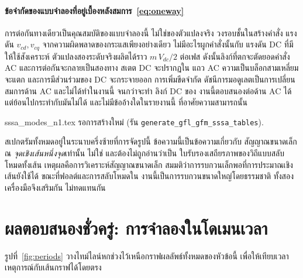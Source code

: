 \documentclass[12pt,a4paper]{article}
\begin{document}
\paragraph{ข้อจำกัดของแบบจำลองที่อยู่เบื้องหลังสมการ~\eqref{eq:oneway}}
การต่อกันทางเดียวเป็นคุณสมบัติของแบบจำลองนี้ ไม่ใช่ของตัวแปลงจริง วงรอบชั้นในสร้างคำสั่ง
แรงดัน $v_{cd},v_{cq}$ จากความผิดพลาดของกระแสเพียงอย่างเดียว ไม่มีอะไรผูกคำสั่งนั้นกับ
แรงดัน DC ที่มีให้ใช้สังเคราะห์ ตัวแปลงสองระดับจริงผลิตได้ราว $m\,V_{dc}/2$ ต่อเฟส
ดังนั้นลิงก์ที่ตกจะตัดยอดคำสั่ง AC และการต่อกันจะกลายเป็นสองทาง สเตต DC จะปรากฏใน
แถว AC ความเป็นบล็อกสามเหลี่ยมจะแตก และการมีส่วนร่วมของ DC จะกระจายออก การเพิ่มขีดจำกัด
ดัชนีการมอดูเลตเป็นการเปลี่ยนสมการด้าน AC และไม่ได้ทำในงานนี้ จนกว่าจะทำ ลิงก์ DC ของ
งานนี้ตอบสนองต่อด้าน AC ได้แต่ย้อนไปกระทำกับมันไม่ได้ และไม่มีข้ออ้างใดในรายงานนี้
ที่อาศัยความสามารถนั้น

\begin{center}\footnotesize
{}
 {}
 {\ttfamily sssa\_modes\_n1.tex รอการสร้างใหม่
  (รัน \texttt{generate\_gfl\_gfm\_sssa\_tables}).}
\end{center}

สเปกตรัมทั้งหมดอยู่ในระนาบครึ่งซ้ายที่การจัดรูปนี้ ข้อความนี้เป็นข้อความเกี่ยวกับ
สัญญาณขนาดเล็ก ณ \emph{จุดเชิงเส้นหนึ่งจุด}เท่านั้น ไม่ใช่ และต้องไม่ถูกอ่านว่าเป็น
ใบรับรองเสถียรภาพของวิถีแบบสลับโหมดทั้งเส้น เหตุผลคือการวิเคราะห์สัญญาณขนาดเล็ก
สมมติว่าการรบกวนเล็กพอที่การประมาณเชิงเส้นยังใช้ได้ ขณะที่ฟอลต์และการสลับโหมดใน
งานนี้เป็นการรบกวนขนาดใหญ่โดยธรรมชาติ ทั้งสองเครื่องมือจึงเสริมกัน ไม่ทดแทนกัน

\section{ผลตอบสนองชั่วครู่: การจำลองในโดเมนเวลา}\label{sec:transient}
รูปที่~\ref{fig:periods} วางไทม์ไลน์หกช่วงไว้เหนือกราฟผลลัพธ์ทั้งหมดของหัวข้อนี้
เพื่อให้เทียบเวลาเหตุการณ์กับเส้นกราฟได้โดยตรง
\end{document}
